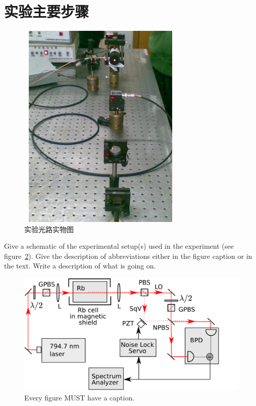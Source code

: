 \documentclass[UTF8,a4paper,12pt]{article}
\begin{document}
\section{实验主要步骤}
\begin{figure}[htbp] 
 \centering \includegraphics[width=8cm,height=10cm]{shiwutu}
 \caption{\label{fig:shiwutu}实验光路实物图}
\end{figure}
Give a schematic of the experimental setup(s) used in the experiment (see
figure~\ref{fig:samplesetup}). Give the description of  abbreviations
either in the figure caption or in the text. Write a description of what is
going on. 

\begin{figure}[ht] 
        \centering \includegraphics[width=0.8\columnwidth]{sr_setup}
        \caption{
                \label{fig:samplesetup} %
                Every figure MUST have a caption.
        }
\end{figure}
\end{document}
